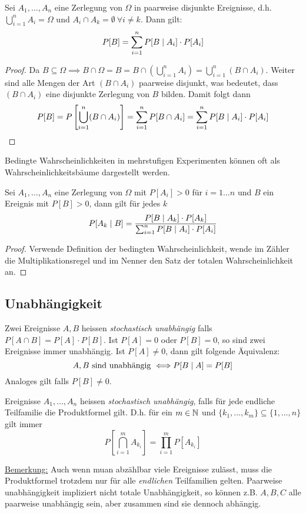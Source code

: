 \begin{satz}
Sei $A_1,\dots,A_n$ eine Zerlegung von $\Omega$ in paarweise disjunkte Ereignisse, d.h. $\bigcup_{i=1}^n A_i = \Omega$ und $A_i \cap A_k = \emptyset \: \forall i\neq k$. Dann gilt:
$$ P[B] = \sum_{i=1}^n P[B \;|\; A_i] \cdot P[A_i]$$
\end{satz}
\begin{proof}
Da $B\subseteq \Omega \implies B \cap \Omega = B = B \cap \left( \bigcup_{i=1}^n A_i \right) = \bigcup_{i=1}^n \left(B \cap A_i \right)$. Weiter sind alle Mengen der Art $(B \cap A_i)$ paarweise disjunkt, was bedeutet, dass $(B\cap A_i)$ eine disjunkte Zerlegung von $B$ bilden. Damit folgt dann 
$$ P[B] = P\left[ \bigcup_{i=1}^n (B \cap A_i) \right] = \sum_{i=1}^n P[B \cap A_i] = \sum_{i=1}^n P[B \;|\; A_i] \cdot P[A_i]$$
\end{proof}
Bedingte Wahrscheinlichkeiten in mehrstufigen Experimenten können oft als Wahrscheinlichkeitsbäume dargestellt werden.

\begin{satz}
Sei $A_1,\dots,A_n$ eine Zerlegung von $\Omega$ mit $P[A_i] > 0$ für $i = 1 \dots n$ und $B$ ein Ereignis mit $P[B] > 0$, dann gilt für jedes $k$
$$ P[A_k \;|\; B] = \frac{P[B \;|\; A_k]\cdot P[A_k]}{\sum_{i=1}^n P[B \;|\; A_i] \cdot P[A_i]}$$
\end{satz}
\begin{proof}
Verwende Definition der bedingten Wahrscheinlichkeit, wende im Zähler die Multiplikationsregel und im Nenner den Satz der totalen Wahrscheinlichkeit an.
\end{proof}

\subsection{Unabhängigkeit}
\begin{definition}
Zwei Ereignisse $A,B$ heissen \textit{stochastisch unabhängig} falls $P[A \cap B] = P[A] \cdot P[B]$. Ist $P[A]=0$ oder $P[B] = 0$, so sind zwei Ereignisse immer unabhängig. Ist $P[A]\neq 0$, dann gilt folgende Äquivalenz:
$$ A, B \mbox{ sind unabhängig } \Longleftrightarrow P[B \;|\; A] = P[B]$$
Analoges gilt falls $P[B] \neq 0$.
\end{definition}

\begin{definition}
Ereignisse $A_1,\dots,A_n$ heissen \textit{stochastisch unabhängig}, falls für jede endliche Teilfamilie die Produktformel gilt. D.h. für ein $m \in \mathbb{N}$ und $\{k_1,\dots, k_m\} \subseteq \{1, \dots, n\}$ gilt immer
$$ P \left[ \bigcap_{i=1}^m A_{k_i} \right] = \prod_{i=1}^m P[A_{k_i}]$$
\end{definition}
\underline{Bemerkung:} Auch wenn muan abzählbar viele Ereignisse zulässt, muss die Produktformel trotzdem nur für alle \textit{endlichen} Teilfamilien gelten. Paarweise unabhängigkeit impliziert nicht totale Unabhängigkeit, so können z.B. $A,B,C$ alle paarweise unabhängig sein, aber zusammen sind sie dennoch abhängig.

	

	
	
	
	